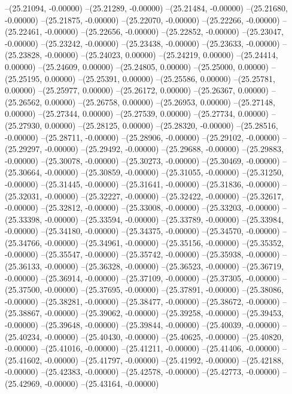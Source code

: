 --(25.21094, -0.00000)
--(25.21289, -0.00000)
--(25.21484, -0.00000)
--(25.21680, -0.00000)
--(25.21875, -0.00000)
--(25.22070, -0.00000)
--(25.22266, -0.00000)
--(25.22461, -0.00000)
--(25.22656, -0.00000)
--(25.22852, -0.00000)
--(25.23047, -0.00000)
--(25.23242, -0.00000)
--(25.23438, -0.00000)
--(25.23633, -0.00000)
--(25.23828, -0.00000)
--(25.24023, 0.00000)
--(25.24219, 0.00000)
--(25.24414, 0.00000)
--(25.24609, 0.00000)
--(25.24805, 0.00000)
--(25.25000, 0.00000)
--(25.25195, 0.00000)
--(25.25391, 0.00000)
--(25.25586, 0.00000)
--(25.25781, 0.00000)
--(25.25977, 0.00000)
--(25.26172, 0.00000)
--(25.26367, 0.00000)
--(25.26562, 0.00000)
--(25.26758, 0.00000)
--(25.26953, 0.00000)
--(25.27148, 0.00000)
--(25.27344, 0.00000)
--(25.27539, 0.00000)
--(25.27734, 0.00000)
--(25.27930, 0.00000)
--(25.28125, 0.00000)
--(25.28320, -0.00000)
--(25.28516, -0.00000)
--(25.28711, -0.00000)
--(25.28906, -0.00000)
--(25.29102, -0.00000)
--(25.29297, -0.00000)
--(25.29492, -0.00000)
--(25.29688, -0.00000)
--(25.29883, -0.00000)
--(25.30078, -0.00000)
--(25.30273, -0.00000)
--(25.30469, -0.00000)
--(25.30664, -0.00000)
--(25.30859, -0.00000)
--(25.31055, -0.00000)
--(25.31250, -0.00000)
--(25.31445, -0.00000)
--(25.31641, -0.00000)
--(25.31836, -0.00000)
--(25.32031, -0.00000)
--(25.32227, -0.00000)
--(25.32422, -0.00000)
--(25.32617, -0.00000)
--(25.32812, -0.00000)
--(25.33008, -0.00000)
--(25.33203, -0.00000)
--(25.33398, -0.00000)
--(25.33594, -0.00000)
--(25.33789, -0.00000)
--(25.33984, -0.00000)
--(25.34180, -0.00000)
--(25.34375, -0.00000)
--(25.34570, -0.00000)
--(25.34766, -0.00000)
--(25.34961, -0.00000)
--(25.35156, -0.00000)
--(25.35352, -0.00000)
--(25.35547, -0.00000)
--(25.35742, -0.00000)
--(25.35938, -0.00000)
--(25.36133, -0.00000)
--(25.36328, -0.00000)
--(25.36523, -0.00000)
--(25.36719, -0.00000)
--(25.36914, -0.00000)
--(25.37109, -0.00000)
--(25.37305, -0.00000)
--(25.37500, -0.00000)
--(25.37695, -0.00000)
--(25.37891, -0.00000)
--(25.38086, -0.00000)
--(25.38281, -0.00000)
--(25.38477, -0.00000)
--(25.38672, -0.00000)
--(25.38867, -0.00000)
--(25.39062, -0.00000)
--(25.39258, -0.00000)
--(25.39453, -0.00000)
--(25.39648, -0.00000)
--(25.39844, -0.00000)
--(25.40039, -0.00000)
--(25.40234, -0.00000)
--(25.40430, -0.00000)
--(25.40625, -0.00000)
--(25.40820, -0.00000)
--(25.41016, -0.00000)
--(25.41211, -0.00000)
--(25.41406, -0.00000)
--(25.41602, -0.00000)
--(25.41797, -0.00000)
--(25.41992, -0.00000)
--(25.42188, -0.00000)
--(25.42383, -0.00000)
--(25.42578, -0.00000)
--(25.42773, -0.00000)
--(25.42969, -0.00000)
--(25.43164, -0.00000)
